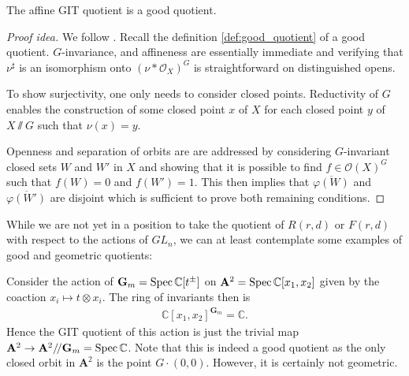 \documentclass[12pt]{ociamthesis}  %
\begin{document}
\begin{theorem}\label{thm:affine_quotient_is_good}
  The affine GIT quotient is a good quotient.
  \begin{proof}[Proof idea]
    We follow \cite[Theorem 4.30]{hoskins2016}. Recall the definition
    \ref{def:good_quotient} of a good quotient. $G$-invariance,
    and affineness are essentially immediate and verifying that
    $\nu^\sharp$ is an isomorphism onto $(\nu*\mathscr O_X)^G$
    is straightforward on distinguished opens.

    To show surjectivity, one only needs to consider closed points.
    Reductivity of $G$ enables the construction of some closed point
    $x$ of $X$ for each closed point $y$ of $X\sslash G$ such that
    $\nu(x) = y$.

    Openness and separation of orbits are are addressed by considering
    $G$-invariant closed sets $W$ and $W'$ in $X$ and showing that
    it is possible to find $f\in\mathscr O(X)^G$ such that
    $f(W) = 0$ and $f(W') = 1$. \cite[Lemma 4.29]{hoskins2016}
    This then implies that $\overline{\varphi(W)}$ and $\overline{\varphi(W')}$
    are disjoint which is sufficient to prove both remaining conditions.
  \end{proof}
\end{theorem}

While we are not yet in a position to take the quotient of $R(r,d)$
or $F(r,d)$ with respect to the actions of $GL_n$,
we can at least contemplate some examples of good and geometric
quotients:

\begin{example}\label{ex:a2_action}
  Consider the action of $\mathbf G_m = \operatorname{Spec}\mathbb C[t^\pm]$ on
  $\mathbf A^2 = \operatorname{Spec}\mathbb C[x_1, x_2]$ given by
  the coaction $x_i \mapsto t\otimes x_i$. The ring of
  invariants then is
  \begin{align*}
    \mathbb C[x_1,x_2]^{\mathbf G_m} = \mathbb C.
  \end{align*}
  Hence the GIT quotient of this action is just the
  trivial map $\mathbf A^2 \to \mathbf A^2 /\!/ \mathbf G_m = \operatorname{Spec}\mathbb C$. Note that this
  is indeed a good quotient as the only closed orbit in $\mathbf A^2$ is
  the point $G\cdot(0,0)$. However, it is certainly not geometric.
\end{example}
\end{document}
